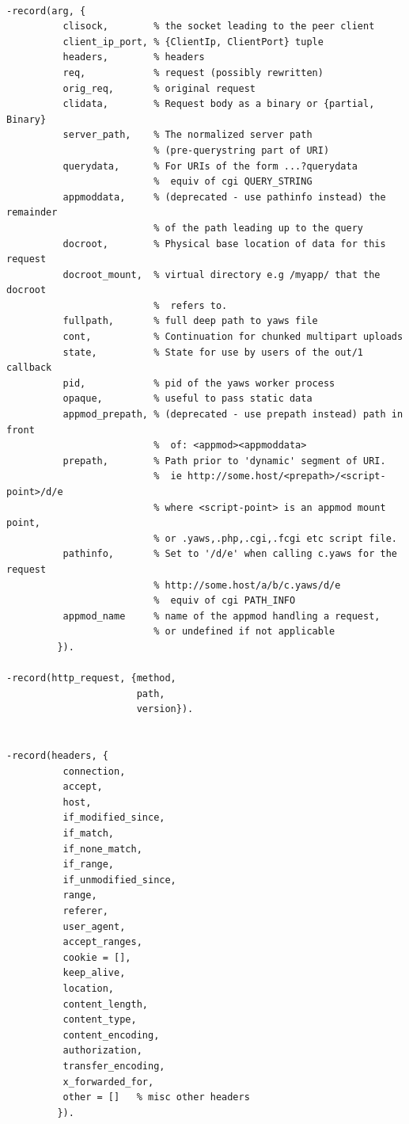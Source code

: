 \documentclass[11pt,oneside,english]{book}
\begin{document}
\begin{verbatim}

-record(arg, {
          clisock,        % the socket leading to the peer client
          client_ip_port, % {ClientIp, ClientPort} tuple
          headers,        % headers
          req,            % request (possibly rewritten)
          orig_req,       % original request
          clidata,        % Request body as a binary or {partial, Binary}
          server_path,    % The normalized server path
                          % (pre-querystring part of URI)
          querydata,      % For URIs of the form ...?querydata
                          %  equiv of cgi QUERY_STRING
          appmoddata,     % (deprecated - use pathinfo instead) the remainder
                          % of the path leading up to the query
          docroot,        % Physical base location of data for this request
          docroot_mount,  % virtual directory e.g /myapp/ that the docroot
                          %  refers to.
          fullpath,       % full deep path to yaws file
          cont,           % Continuation for chunked multipart uploads
          state,          % State for use by users of the out/1 callback
          pid,            % pid of the yaws worker process
          opaque,         % useful to pass static data
          appmod_prepath, % (deprecated - use prepath instead) path in front
                          %  of: <appmod><appmoddata>
          prepath,        % Path prior to 'dynamic' segment of URI.
                          %  ie http://some.host/<prepath>/<script-point>/d/e
                          % where <script-point> is an appmod mount point,
                          % or .yaws,.php,.cgi,.fcgi etc script file.
          pathinfo,       % Set to '/d/e' when calling c.yaws for the request
                          % http://some.host/a/b/c.yaws/d/e
                          %  equiv of cgi PATH_INFO
          appmod_name     % name of the appmod handling a request,
                          % or undefined if not applicable
         }).

-record(http_request, {method,
                       path,
                       version}).


-record(headers, {
          connection,
          accept,
          host,
          if_modified_since,
          if_match,
          if_none_match,
          if_range,
          if_unmodified_since,
          range,
          referer,
          user_agent,
          accept_ranges,
          cookie = [],
          keep_alive,
          location,
          content_length,
          content_type,
          content_encoding,
          authorization,
          transfer_encoding,
          x_forwarded_for,
          other = []   % misc other headers
         }).

\end{verbatim}
\end{document}
